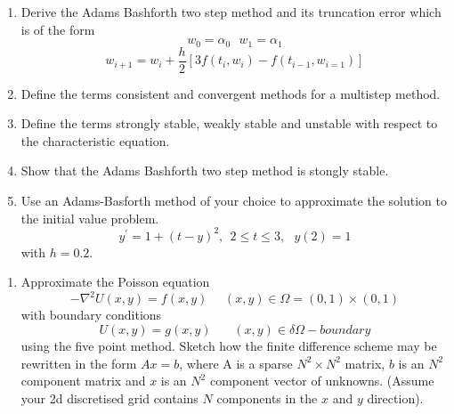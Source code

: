 \documentclass[a4paper,12pt]{article}
\theoremstyle{Qstyle}
\begin{document}
\begin{enumerate}
\begin{question}{33}
	\begin{enumerate}
		\item
		Derive the Adams Bashforth two step method and its truncation error which is of the form
		\[w_0=\alpha_0 \ \ \ w_1=\alpha_1 \]
		\[w_{i+1}=w_i + \frac{h}{2}[3f(t_i,w_i)-f(t_{i-1},w_{i=1})] \]
		\item
		Define the terms consistent and convergent methods for a multistep method.
		\item
		Define the terms strongly stable, weakly stable and unstable with respect to the
		characteristic equation.
		\item
		Show that the Adams Bashforth two step method is  stongly stable.
		\item
		Use an Adams-Basforth method of your choice to approximate the solution to the initial value problem.
		\[y^{'}=1+(t-y)^2, \ \  2\leq t \leq 3,  \ \ \ y(2) = 1 \]
		with $h=0.2$.
		\end{enumerate}
\end{question}

\begin{question}{33}
	\begin{enumerate}
		\item
		Approximate the Poisson equation 
		\[ -\nabla^2U(x,y)=f(x,y) \ \ \ \ \ \ (x,y) \in \Omega=(0,1)\times (0,1) \]
		with boundary conditions
		\[U(x,y) = g(x,y) \ \ \ \ \ \ \ \  (x,y)\in\delta\Omega-boundary \]
		using the five point method.  Sketch how the finite difference scheme may be 
		rewritten in the form $Ax=b$, where A is a sparse
		$N^2\times N^2$ matrix, $b$ is an $N^2$ component matrix and $x$ is an $N^2$
		component vector of unknowns.
		(Assume your 2d discretised grid contains $N$ components in the $x$ and $y$ direction).
		

\end{enumerate}
\end{question}
\end{enumerate}
\end{document}
